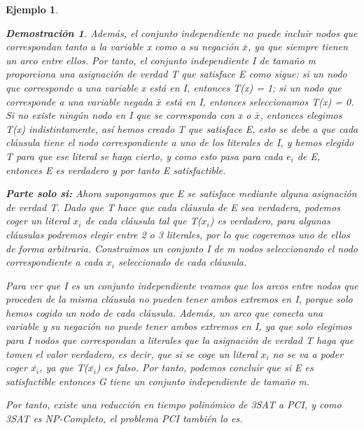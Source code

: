 \documentclass[a4paper,12pt,titlepage]{article}
\newtheorem{eje}{Ejemplo}[section]
\newtheorem*{dem}{\textbf{Demostraci\'on}}
\begin{document}
\begin{eje}
\begin{dem}
Adem\'as, el conjunto independiente no puede incluir nodos que correspondan tanto a la variable x como a su negaci\'on $\bar{x}$, ya que siempre tienen un arco entre ellos. Por tanto, el conjunto independiente I de tamaño m proporciona una asignaci\'on  de verdad T que satisface E como sigue: si un nodo que corresponde a una variable x est\'a en I, entonces T(x) = 1; si un nodo que corresponde a una variable negada $\bar{x}$ est\'a en I, entonces seleccionamos T(x) = 0. Si no existe ning\'un nodo en I que se corresponda con x o $\bar{x}$, entonces elegimos T(x) indistintamente, as\'i hemos creado T que satisface E, esto se debe a que cada cl\'ausula tiene el nodo correspondiente a uno de los literales de I, y hemos elegido T para que ese literal se haga cierto, y como esto pasa para cada $e_i$ de E, entonces E es verdadero y por tanto E satisfactible.

\vspace{\baselineskip}

\textbf{Parte solo si:} Ahora supongamos que E se satisface mediante alguna asignaci\'on de verdad T. Dado que T hace que cada cl\'ausula de E sea verdadera, podemos coger un literal $x_i$ de cada cl\'ausula tal que T($x_i$) es verdadero, para algunas cl\'ausulas podremos elegir entre 2 o 3 literales, por lo que cogeremos uno de ellos de forma arbitraria. Construimos un conjunto I de m nodos seleccionando el nodo correspondiente a cada $x_i$ seleccionado de cada cl\'ausula.

\vspace{\baselineskip}

Para ver que I es un conjunto independiente veamos que los arcos entre nodos que proceden de la misma cl\'ausula no pueden tener ambos extremos en I, porque solo hemos cogido un nodo de cada cl\'ausula. Adem\'as, un arco que conecta una variable y su negaci\'on no puede tener ambos extremos en I, ya que solo elegimos para I nodos que correspondan a literales que la asignaci\'on de verdad T haga que tomen el valor verdadero, es decir, que si se coge un literal $x_i$ no se va a poder coger $\bar{x_i}$, ya que T($\bar{x_i}$) es falso. Por tanto, podemos concluir que si E es satisfactible entonces G tiene un conjunto independiente de tamaño m.

Por tanto, existe una reducci\'on en tiempo polin\'omico de 3SAT a PCI, y como 3SAT es NP-Completo\cite{HopcroftESP}, el problema PCI tambi\'en lo es.

\end{dem}

\end{eje}
\end{document}
